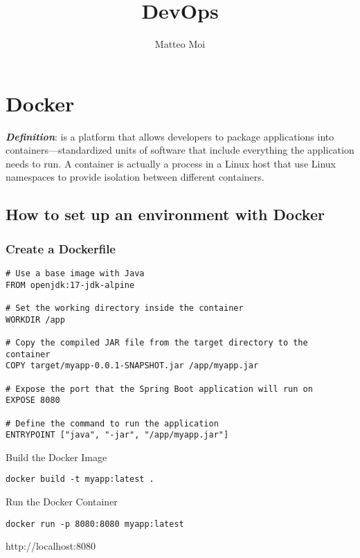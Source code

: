 \documentclass[a4paper, 12pt]{article}
\begin{document}
    \title{DevOps}
    \author{Matteo Moi}
    \date{}
    \maketitle

    \tableofcontents
    \newpage


    \section{Docker}
    \textit{\textbf{Definition}}: is a platform that allows developers to package applications into containers—standardized units of software that include everything the application needs to run.
    A container is actually a process in a Linux host that use Linux namespaces to provide isolation between different containers.

    \subsection{How to set up an environment with Docker}

    \subsubsection{Create a Dockerfile}
    \begin{lstlisting}
# Use a base image with Java
FROM openjdk:17-jdk-alpine

# Set the working directory inside the container
WORKDIR /app

# Copy the compiled JAR file from the target directory to the container
COPY target/myapp-0.0.1-SNAPSHOT.jar /app/myapp.jar

# Expose the port that the Spring Boot application will run on
EXPOSE 8080

# Define the command to run the application
ENTRYPOINT ["java", "-jar", "/app/myapp.jar"]

    \end{lstlisting}

    Build the Docker Image
    \begin{lstlisting}
docker build -t myapp:latest .
    \end{lstlisting}

    Run the Docker Container
    \begin{lstlisting}
docker run -p 8080:8080 myapp:latest
    \end{lstlisting}
    http://localhost:8080
\end{document}
